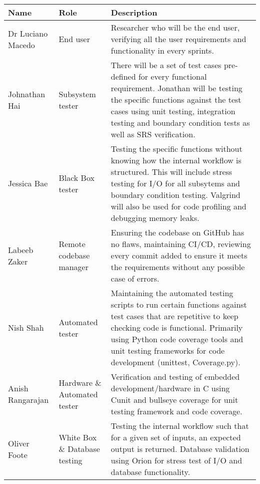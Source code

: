 \documentclass[12pt, titlepage]{article}
\begin{document}
\begin{tabular}{|m{5em}|m{5em}|m{25em}|}
  \hline
  \textbf{Name}     & \textbf{Role}           & \textbf{Description}                                                                                                                                                                        \\
  \hline
  Dr Luciano Macedo & End user                & Researcher who will be the end user, verifying all the user requirements and functionality in every sprints.                                                                                                             \\
  \hline
  Johnathan Hai     & Subsystem tester       & There will be a set of test cases pre-defined for every functional requirement. Jonathan will be testing the specific functions against the test cases using unit testing, integration testing and boundary condition tests as well as SRS verification. \\
  \hline
  Jessica Bae       & Black Box tester        & Testing the specific functions without knowing how the internal workflow is structured. This will include stress testing for I/O for all subsytems and boundary condition testing. Valgrind will also be used for code profiling and debugging memory leaks.                                                                                         \\
  \hline
  Labeeb Zaker      & Remote codebase manager & Ensuring the codebase on GitHub has no flaws, maintaining CI/CD, reviewing every commit added to ensure it meets the requirements without any possible case of errors. \\
  \hline
  Nish Shah         & Automated tester        & Maintaining the automated testing scripts to run certain functions against test cases that are repetitive to keep checking code is functional. Primarily using Python code coverage tools and unit testing frameworks for code development (unittest, Coverage.py).                                                          \\
  \hline
  Anish Rangarajan  & Hardware \& Automated tester    & Verification and testing of embedded development/hardware in C using Cunit and bullseye coverage for unit testing framework and code coverage.\\
  \hline
  Oliver Foote      & White Box \& Database testing        & Testing the internal workflow such that for a given set of inputs, an expected output is returned. Database validation using Orion for stress test of I/O and database functionality. \\
  \hline
\end{tabular}
\end{document}

